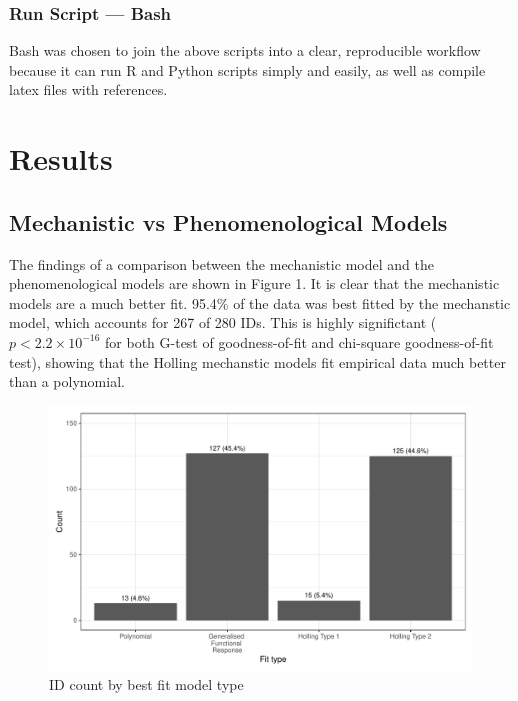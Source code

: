 \documentclass[11pt, a4paper, titlepage]{article}
\begin{document}
\subsubsection{Run Script — Bash}

Bash was chosen to join the above scripts into a clear, reproducible workflow because it can run R and Python scripts simply and easily, as well as compile latex files with references.




\section{Results}

\subsection{Mechanistic vs Phenomenological Models}

The findings of a comparison between the mechanistic model and the phenomenological models are shown in Figure 1. It is clear that the mechanistic models are a much better fit. 95.4\% of the data was best fitted by the mechanstic model, which accounts for 267 of 280 IDs. This is highly significtant ($p < 2.2\times10^{-16}$ for both G-test of goodness-of-fit and chi-square goodness-of-fit test), showing that the Holling mechanstic models fit empirical data much better than a polynomial.

\begin{figure}[ht!]
	\centering\includegraphics[width=1\textwidth]{../Results/Model_Comparison_Barchart.pdf}
	\caption{ID count by best fit model type}
\end{figure}
\end{document}
